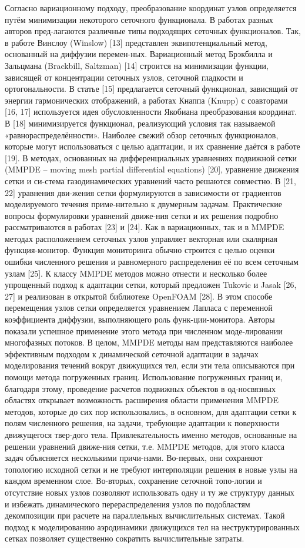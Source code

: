Согласно вариационному подходу, преобразование координат узлов определяется путём минимизации некоторого сеточного функционала. В работах разных авторов пред-лагаются различные типы подходящих сеточных функционалов. Так, в работе Винслоу (Winslow) [13] представлен эквипотенциальный метод, основанный на диффузии перемен-ных. Вариационный метод Брэкбилла и Зальцмана (Brackbill, Saltzman) [14] строится на минимизации функции, зависящей от концентрации сеточных узлов, сеточной гладкости и ортогональности. В статье [15] предлагается сеточный функционал, зависящий от энергии гармонических отображений, а работах Кнаппа (Knupp) с соавторами [16, 17] используется идея обусловленности Якобиана преобразования координат. В [18] минимизируется функционал, реализующий условия так называемой «равнораспределённости». Наиболее свежий обзор сеточных функционалов, которые могут использоваться с целью адаптации, и их сравнение даётся в работе [19].
В методах, основанных на дифференциальных уравнениях подвижной сетки (MMPDE – moving mesh partial differential equations) [20], уравнение движения сетки и си-стема газодинамических уравнений часто решаются совместно. В [21, 22] уравнения дви-жения сетки формулируются в зависимости от градиентов моделируемого течения приме-нительно к двумерным задачам. Практические вопросы формулировки уравнений движе-ния сетки и их решения подробно рассматриваются в работах [23] и [24].
Как в вариационных, так и в MMPDE методах расположением сеточных узлов управляет векторная или скалярная функция-монитор. Функция мониторинга обычно строится с целью оценки ошибки численного решения и равномерного распределения её по всем сеточным узлам [25].
К классу MMPDE методов можно отнести и несколько более упрощенный подход к адаптации сетки, который предложен Tukovic и Jasak [26, 27] и реализован в открытой библиотеке OpenFOAM [28]. В этом способе перемещения узлов сетки определяется уравнением Лапласа с переменной коэффициента диффузии, выполняющего роль функ-ции-монитора. Авторы показали успешное применение этого метода при численном моде-лировании многофазных потоков.
В целом, MMPDE методы нам представляются наиболее эффективным подходом к динамической сеточной адаптации в задачах моделирования течений вокруг движущихся тел, если эти тела описываются при помощи метода погруженных границ. Использование погруженных границ и, благодаря этому, проведение расчетов подвижных объектов в од-носвязных областях открывает возможность расширения области применения MMPDE методов, которые до сих пор использовались, в основном, для адаптации сетки к полям численного решения, на задачи, требующие адаптации к поверхности движущегося твер-дого тела. Привлекательность именно методов, основанные на решении уравнений движе-ния сетки, т.е. MMPDE методов, для этого класса задач объясняется несколькими причи-нами. Во-первых, они сохраняют топологию исходной сетки и не требуют интерполяции решения в новые узлы на каждом временном слое. Во-вторых, сохранение сеточной топо-логии и отсутствие новых узлов позволяют использовать одну и ту же структуру данных и избежать динамического перераспределения узлов по подобластям декомпозиции при расчете на параллельных вычислительных системах. Такой подход к моделированию аэродинамики движущихся тел на неструктурированных сетках позволяет существенно сократить вычислительные затраты.
